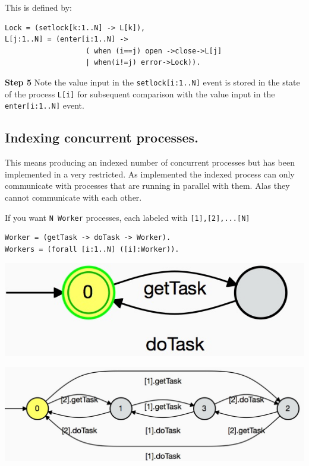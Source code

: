 \documentclass[]{article}
\begin{document}
This is defined by:

\hspace{1in}\begin{minipage}{0.3\textwidth}
\begin{verbatim}
Lock = (setlock[k:1..N] -> L[k]),
L[j:1..N] = (enter[i:1..N] -> 
                   ( when (i==j) open ->close->L[j]
                   | when(i!=j) error->Lock)).   \end{verbatim} 
\end{minipage}


{\bf Step 5} Note the value input in the \verb$setlock[i:1..N]$ event is stored in the state of the process \verb$L[i]$ for subsequent comparison with the value input in the \verb$enter[i:1..N]$ event.



  \subsection{Indexing concurrent processes.} 
  This means producing an indexed number of concurrent processes but has been implemented in a very restricted. As implemented the indexed process can only communicate with processes that are running in parallel with them. Alas they cannot communicate with each other.
  
  
  If you want \verb$N Worker$ processes, each  labeled with \verb$[1],[2],...[N]$ 
   
 \begin{center}\begin{minipage}{0.55\textwidth}
\begin{verbatim}
Worker = (getTask -> doTask -> Worker).
Workers = (forall [i:1..N] ([i]:Worker)).
   \end{verbatim} 
\end{minipage}\begin{minipage}{0.4\textwidth}
\begin{center}\includegraphics[scale=0.3]{Worker.jpg}\end{center}
\end{minipage}

\includegraphics[scale=0.3]{Workers.jpg}
\end{center}
 
\end{document}
